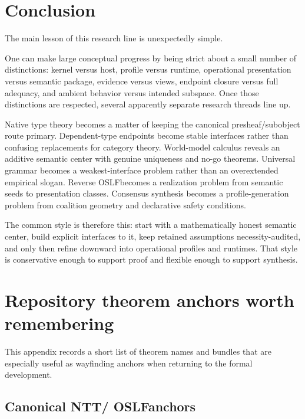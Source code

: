 \documentclass[11pt]{article}
\newcommand{\OSLF}{OSLF}
\newcommand{\NTT}{NTT}
\begin{document}
\section{Conclusion}

The main lesson of this research line is unexpectedly simple.

One can make large conceptual progress by being strict about a small number of distinctions: kernel versus host, profile versus runtime, operational presentation versus semantic package, evidence versus views, endpoint closure versus full adequacy, and ambient behavior versus intended subspace. Once those distinctions are respected, several apparently separate research threads line up.

Native type theory becomes a matter of keeping the canonical presheaf/subobject route primary. Dependent-type endpoints become stable interfaces rather than confusing replacements for category theory. World-model calculus reveals an additive semantic center with genuine uniqueness and no-go theorems. Universal grammar becomes a weakest-interface problem rather than an overextended empirical slogan. Reverse \OSLF becomes a realization problem from semantic seeds to presentation classes. Consensus synthesis becomes a profile-generation problem from coalition geometry and declarative safety conditions.

The common style is therefore this: start with a mathematically honest semantic center, build explicit interfaces to it, keep retained assumptions necessity-audited, and only then refine downward into operational profiles and runtimes. That style is conservative enough to support proof and flexible enough to support synthesis.

\appendix

\section{Repository theorem anchors worth remembering}

This appendix records a short list of theorem names and bundles that are especially useful as wayfinding anchors when returning to the formal development.

\subsection{Canonical \NTT / \OSLF anchors}
\end{document}
